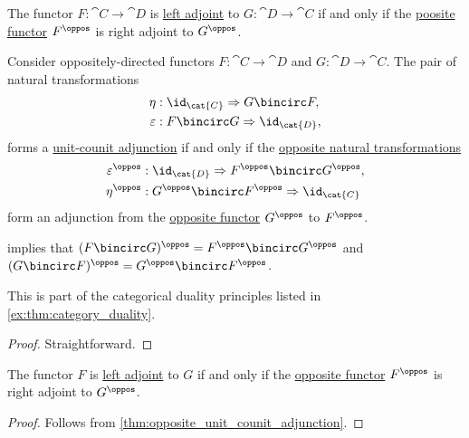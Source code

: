 \begin{proposition}\label{thm:opposite_unit_counit_adjunction}
  The functor \( F: \cat{C} \to \cat{D} \) is \hyperref[def:adjoint_functor]{left adjoint} to \( G: \cat{D} \to \cat{C} \) if and only if the \hyperref[def:opposite_functor]{poosite functor} \( F^\oppos \) is right adjoint to \( G^\oppos \).

  Consider oppositely-directed functors \( F: \cat{C} \to \cat{D} \) and \( G: \cat{D} \to \cat{C} \). The pair of natural transformations
  \begin{align*}
           \eta &: \id_{\cat{C}} \Rightarrow G \bincirc F, \\
    \varepsilon &: F \bincirc G \Rightarrow \id_{\cat{D}},
  \end{align*}
  forms a \hyperref[def:unit_counit_adjunction]{unit-counit adjunction} if and only if the \hyperref[def:opposite_natural_transformation]{opposite natural transformations}
  \begin{align*}
    \varepsilon^\oppos &: \id_{\cat{D}} \Rightarrow F^\oppos \bincirc G^\oppos, \\
           \eta^\oppos &: G^\oppos \bincirc F^\oppos \Rightarrow \id_{\cat{C}}
  \end{align*}
  form an adjunction from the \hyperref[def:opposite_functor]{opposite functor} \( G^\oppos \) to \( F^\oppos \).
\end{proposition}
\begin{comments}
  \item {} implies that \( (F \bincirc G)^\oppos = F^\oppos \bincirc G^\oppos \) and \( (G \bincirc F)^\oppos = G^\oppos \bincirc F^\oppos \).

  \item This is part of the categorical duality principles listed in \cref{ex:thm:category_duality}.
\end{comments}
\begin{proof}
  Straightforward.
\end{proof}

\begin{corollary}\label{thm:opposites_of_adjoint_functors}
  The functor \( F \) is \hyperref[def:adjoint_functor]{left adjoint} to \( G \) if and only if the \hyperref[def:opposite_functor]{opposite functor} \( F^\oppos \) is right adjoint to \( G^\oppos \).
\end{corollary}
\begin{proof}
  Follows from \cref{thm:opposite_unit_counit_adjunction}.
\end{proof}

